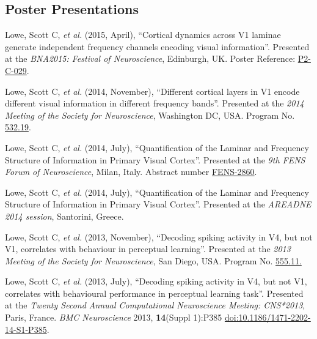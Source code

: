 \documentclass[11pt, a4paper]{article} %
\renewenvironment{itemize}{
  \begin{list}{}{
    \setlength{\leftmargin}{0em}
  }
}{
  \end{list}
}
\begin{document}
%
%
\subsection*{Poster Presentations}
%
%

\begin{itemize}
%
\item
Lowe, Scott C, \textit{et al.} (2015, April), ``Cortical dynamics across V1 laminae generate independent frequency channels encoding visual information''.
{Presented at the \emph{BNA2015: Festival of Neuroscience}, Edinburgh, UK. Poster Reference: \href{http://www.bna.org.uk/static/docs/BNA2015/BNA2015-Abstract-Book.pdf}{P2-C-029}.}
%
\item
Lowe, Scott C, \textit{et al.} (2014, November), ``Different cortical layers in V1 encode different visual information in different frequency bands''.
{Presented at the \emph{2014 Meeting of the Society for Neuroscience}, Washington DC, USA. Program No. \href{http://www.abstractsonline.com/Plan/ViewAbstract.aspx?sKey=a018159d-9116-492d-b234-b4c53acd5260&cKey=e909b23c-40c3-4371-8816-345dfe3e6c3c&mKey=54c85d94-6d69-4b09-afaa-502c0e680ca7}{532.19}.}
%
\item
Lowe, Scott C, \textit{et al.} (2014, July), ``Quantification of the Laminar and Frequency Structure of Information in Primary Visual Cortex''.
{Presented at the \emph{9th FENS Forum of Neuroscience}, Milan, Italy. Abstract number \href{http://fens2014.meetingxpert.net/FENS_427/poster_102139/program.aspx}{FENS-2860}.}
%
\item
Lowe, Scott C, \textit{et al.} (2014, July), ``Quantification of the Laminar and Frequency Structure of Information in Primary Visual Cortex''.
{Presented at the \emph{AREADNE 2014 session}, Santorini, Greece}.
%
\item
Lowe, Scott C, \textit{et al.} (2013, November), ``Decoding spiking activity in V4, but not V1, correlates with behaviour in perceptual learning''.
{Presented at the \emph{2013 Meeting of the Society for Neuroscience}, San Diego, USA. Program No. \href{http://www.abstractsonline.com/Plan/ViewAbstract.aspx?sKey=a69ca081-1031-4c5e-917c-b57b7b7255cf&cKey=5e73e1d9-7177-4207-9890-3efb2a57985b&mKey=8d2a5bec-4825-4cd6-9439-b42bb151d1cf}{555.11.}}
%
\item
Lowe, Scott C, \textit{et al.} (2013, July), ``Decoding spiking activity in V4, but not V1, correlates with behavioural performance in perceptual learning task''.
{Presented at the \emph{Twenty Second Annual Computational Neuroscience Meeting: CNS*2013}, Paris, France}.
\emph{BMC Neuroscience} 2013, \textbf{14}(Suppl 1):P385  \href{http://dx.doi.org/10.1186/1471-2202-14-S1-P385}{doi:10.1186/1471-2202-14-S1-P385}.
%
\end{itemize}
%
%
\end{document}
